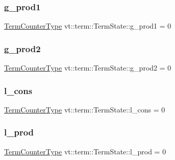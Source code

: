 \subsubsection{\texorpdfstring{g\+\_\+prod1}{g\_prod1}}
{\footnotesize\ttfamily \hyperlink{namespacevt_1_1term_a4fd378cdb0c36683afc1b3399d685f7f}{Term\+Counter\+Type} vt\+::term\+::\+Term\+State\+::g\+\_\+prod1 = 0}

\mbox{\label{structvt_1_1term_1_1_term_state_a5e7029af1dca0645c92f5a00316dc039}} 
\subsubsection{\texorpdfstring{g\+\_\+prod2}{g\_prod2}}
{\footnotesize\ttfamily \hyperlink{namespacevt_1_1term_a4fd378cdb0c36683afc1b3399d685f7f}{Term\+Counter\+Type} vt\+::term\+::\+Term\+State\+::g\+\_\+prod2 = 0}

\mbox{\label{structvt_1_1term_1_1_term_state_a4f44e5ddcb585df5ad215f10bc195d4c}} 
\subsubsection{\texorpdfstring{l\+\_\+cons}{l\_cons}}
{\footnotesize\ttfamily \hyperlink{namespacevt_1_1term_a4fd378cdb0c36683afc1b3399d685f7f}{Term\+Counter\+Type} vt\+::term\+::\+Term\+State\+::l\+\_\+cons = 0}

\mbox{\label{structvt_1_1term_1_1_term_state_afec657b7e75164bdc75f464dd4dbe13b}} 
\subsubsection{\texorpdfstring{l\+\_\+prod}{l\_prod}}
{\footnotesize\ttfamily \hyperlink{namespacevt_1_1term_a4fd378cdb0c36683afc1b3399d685f7f}{Term\+Counter\+Type} vt\+::term\+::\+Term\+State\+::l\+\_\+prod = 0}


